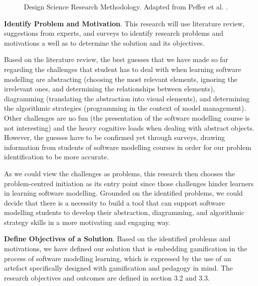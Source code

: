 \documentclass[a4paper]{Report}
\begin{document}
\begin{figure}[h]
\centering
{}
\caption{Design Science Research Methodology. Adapted from Peffer et al. \cite{peffers2007design}.}
\label{fig:003}
\end{figure}

\textbf{Identify Problem and Motivation}. This research will use literature review, suggestions from experts, and surveys to identify research problems and motivations a well as to determine the solution and its objectives.

Based on the literature review, the best guesses that we have made so far regarding the challenges that student has to deal with when learning software modelling are abstracting (choosing the most relevant elements, ignoring the irrelevant ones, and determining the relationships between elements), diagramming (translating the abstraction into visual elements), and determining the algorithmic strategies (programming in the context of model management). Other challenges are no fun (the presentation of the software modelling course is not interesting) and the heavy cognitive loads when dealing with abstract objects. However, the guesses have to be confirmed yet through surveys, drawing information from students of software modelling courses in order for our problem identification to be more accurate.

As we could view the challenges as problems, this research then chooses the problem-centred initiation as its entry point since those challenges hinder learners in learning software modelling.  Grounded on the identified problems, we could decide that there is a necessity to build a tool that can support software modelling students to develop their abstraction, diagramming, and algorithmic strategy skills in a more motivating and engaging way. 

\textbf{Define Objectives of a Solution}. Based on the identified problems and motivations, we have defined our solution that is embedding gamification in the process of software modelling learning, which is expressed by the use of an artefact specifically designed with gamification and pedagogy in mind. The research objectives and outcomes are defined in section 3.2 and 3.3.
\end{document}
